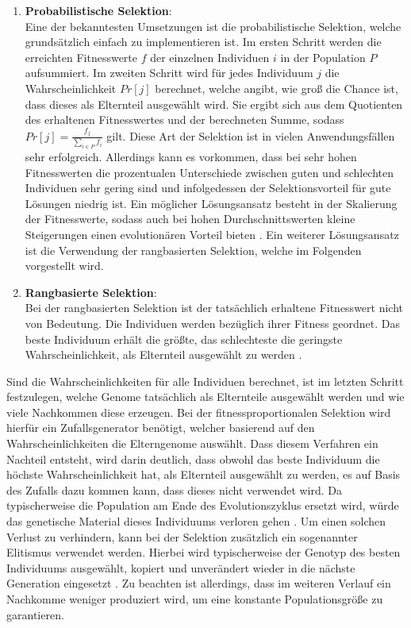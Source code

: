 \begin{enumerate}
	\item \textbf{Probabilistische Selektion}:\\
	Eine der bekanntesten Umsetzungen ist die probabilistische Selektion, welche grundsätzlich einfach zu implementieren ist. Im ersten Schritt werden die erreichten Fitnesswerte $f$ der einzelnen Individuen $i$ in der Population $P$ aufsummiert. Im zweiten Schritt wird für jedes Individuum $j$ die Wahrscheinlichkeit $Pr[j]$ berechnet, welche angibt, wie groß die Chance ist, dass dieses als Elternteil ausgewählt wird. Sie ergibt sich aus dem Quotienten des erhaltenen Fitnesswertes und der berechneten Summe, sodass $Pr[j]=\frac{f_j}{\sum_{i \in P}f_i}$ gilt. Diese Art der Selektion ist in vielen Anwendungsfällen sehr erfolgreich. Allerdings kann es vorkommen, dass bei sehr hohen Fitnesswerten die prozentualen Unterschiede zwischen guten und schlechten Individuen sehr gering sind und infolgedessen der Selektionsvorteil für gute Lösungen niedrig ist. Ein möglicher Lösungsansatz besteht in der Skalierung der Fitnesswerte, sodass auch bei hohen Durchschnittswerten kleine Steigerungen einen evolutionären Vorteil bieten \cite{weicker2015evolutionare}. Ein weiterer Lösungsansatz ist die Verwendung der rangbasierten Selektion, welche im Folgenden vorgestellt wird.
	
	\item  \textbf{Rangbasierte Selektion}:\\
	Bei der rangbasierten Selektion ist der tatsächlich erhaltene Fitnesswert nicht von Bedeutung. Die Individuen werden bezüglich ihrer Fitness geordnet. Das beste Individuum erhält die größte, das schlechteste die geringste Wahrscheinlichkeit, als Elternteil ausgewählt zu werden \cite{weicker2015evolutionare}. 
\end{enumerate}
Sind die Wahrscheinlichkeiten für alle Individuen berechnet, ist im letzten Schritt festzulegen, welche Genome tatsächlich als Elternteile ausgewählt werden und wie viele Nachkommen diese erzeugen. Bei der fitnessproportionalen Selektion wird hierfür ein Zufallsgenerator benötigt, welcher basierend auf den Wahrscheinlichkeiten die Elterngenome auswählt. Dass diesem Verfahren ein Nachteil entsteht, wird darin deutlich, dass obwohl das beste Individuum die höchste Wahrscheinlichkeit hat, als Elternteil ausgewählt zu werden, es auf Basis des Zufalls dazu kommen kann, dass dieses nicht verwendet wird. Da typischerweise die Population am Ende des Evolutionszyklus ersetzt wird, würde das genetische Material dieses Individuums verloren gehen \cite{weicker2015evolutionare}. Um einen solchen Verlust zu verhindern, kann bei der Selektion zusätzlich ein sogenannter Elitismus verwendet werden. Hierbei wird typischerweise der Genotyp des besten Individuums ausgewählt, kopiert und unverändert wieder in die nächste Generation eingesetzt \cite{such2017deep}. Zu beachten ist allerdings, dass im weiteren Verlauf ein Nachkomme weniger produziert wird, um eine konstante Populationsgröße zu garantieren. 

